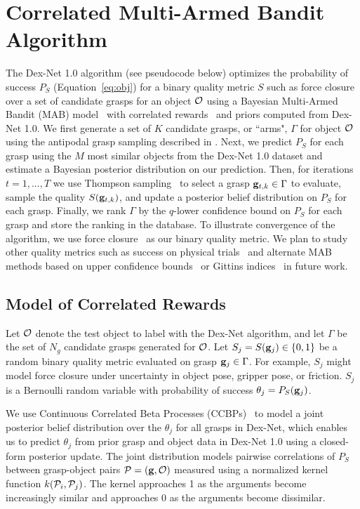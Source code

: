 \section{Correlated Multi-Armed Bandit Algorithm}
The Dex-Net 1.0 algorithm (see pseudocode below) optimizes the probability of success $P_S$ (Equation~\ref{eq:obj}) for a binary quality metric $S$ such as force closure over a set of candidate grasps for an object $\mathcal{O}$ using a Bayesian Multi-Armed Bandit (MAB) model~\cite{laskey2015bandits, srinivas10gaussian} with correlated rewards~\cite{hoffman2013exploiting, pandey2007multi} and priors computed from Dex-Net 1.0.
We first generate a set of $K$ candidate grasps, or ``arms", $\Gamma$ for object $\mathcal{O}$ using the antipodal grasp sampling described in .
Next, we predict $P_S$ for each grasp using the $M$ most similar objects from the Dex-Net 1.0 dataset and estimate a Bayesian posterior distribution on our prediction.
Then, for iterations $t=1,...,T$ we use Thompson sampling~\cite{laskey2015bandits, oberlin2015autonomously} to select a grasp $\mathbf{g}_{t,k} \in \Gamma$ to evaluate, sample the quality $S(\mathbf{g}_{t,k})$, and update a posterior belief distribution on $P_S$ for each grasp.
Finally, we rank $\Gamma$ by the $q$-lower confidence bound on $P_S$ for each grasp and store the ranking in the database.
To illustrate convergence of the algorithm, we use force closure~\cite{zheng2005} as our binary quality metric.
We plan to study other quality metrics such as success on physical trials~\cite{kroemer2010combining, montesano2012active} and alternate MAB methods based on upper confidence bounds~\cite{kroemer2010combining, oberlin2015autonomously} or Gittins indices~\cite{laskey2015bandits} in future work.

\subsection{Model of Correlated Rewards}
Let $\mathcal{O}$ denote the test object to label with the Dex-Net algorithm, and let $\Gamma$ be the set of $N_g$ candidate grasps generated for $\mathcal{O}$.
Let $S_{j} = S(\mathbf{g}_{j}) \in \{0, 1\}$ be a random binary quality metric evaluated on grasp $\mathbf{g}_{j} \in \Gamma$.
For example, $S_j$ might model force closure under uncertainty in object pose, gripper pose, or friction. 
$S_j$ is a Bernoulli random variable with probability of success $\theta_{j}= P_S(\mathbf{g}_{j})$.

We use Continuous Correlated Beta Processes (CCBPs)~\cite{goetschalckx2011continuous, montesano2012active} to model a joint posterior belief distribution over the $\theta_j$ for all grasps in Dex-Net, which enables us to predict $\theta_j$ from prior grasp and object data in Dex-Net 1.0 using a closed-form posterior update.
The joint distribution models pairwise correlations of $P_S$ between grasp-object pairs $\mathcal{P} = (\mathbf{g}, \mathcal{O})$ measured using a normalized kernel function $k(\mathcal{P}_i, \mathcal{P}_j)$.
The kernel approaches 1 as the arguments become increasingly similar and approaches 0 as the arguments become dissimilar.


